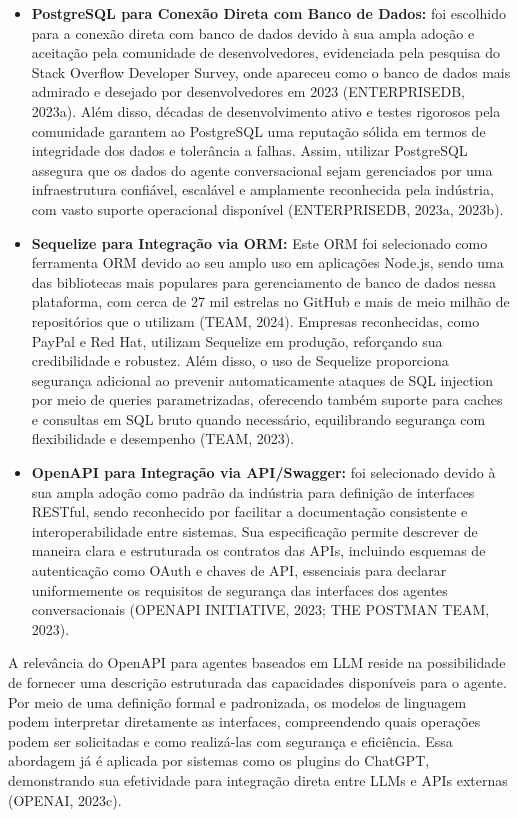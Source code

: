 \documentclass[
]{article}
\begin{document}
\begin{itemize}
\item
  \textbf{PostgreSQL para Conexão Direta com Banco de Dados:} foi
  escolhido para a conexão direta com banco de dados devido à sua ampla
  adoção e aceitação pela comunidade de desenvolvedores, evidenciada
  pela pesquisa do Stack Overflow Developer Survey, onde apareceu como o
  banco de dados mais admirado e desejado por desenvolvedores em 2023
  (ENTERPRISEDB, 2023a). Além disso, décadas de desenvolvimento ativo e
  testes rigorosos pela comunidade garantem ao PostgreSQL uma reputação
  sólida em termos de integridade dos dados e tolerância a falhas.
  Assim, utilizar PostgreSQL assegura que os dados do agente
  conversacional sejam gerenciados por uma infraestrutura confiável,
  escalável e amplamente reconhecida pela indústria, com vasto suporte
  operacional disponível (ENTERPRISEDB, 2023a, 2023b).
\item
  \textbf{Sequelize para Integração via ORM:} Este ORM foi selecionado
  como ferramenta ORM devido ao seu amplo uso em aplicações Node.js,
  sendo uma das bibliotecas mais populares para gerenciamento de banco
  de dados nessa plataforma, com cerca de 27 mil estrelas no GitHub e
  mais de meio milhão de repositórios que o utilizam (TEAM, 2024).
  Empresas reconhecidas, como PayPal e Red Hat, utilizam Sequelize em
  produção, reforçando sua credibilidade e robustez. Além disso, o uso
  de Sequelize proporciona segurança adicional ao prevenir
  automaticamente ataques de SQL injection por meio de queries
  parametrizadas, oferecendo também suporte para caches e consultas em
  SQL bruto quando necessário, equilibrando segurança com flexibilidade
  e desempenho (TEAM, 2023).
\item
  \textbf{OpenAPI para Integração via API/Swagger:} foi selecionado
  devido à sua ampla adoção como padrão da indústria para definição de
  interfaces RESTful, sendo reconhecido por facilitar a documentação
  consistente e interoperabilidade entre sistemas. Sua especificação
  permite descrever de maneira clara e estruturada os contratos das
  APIs, incluindo esquemas de autenticação como OAuth e chaves de API,
  essenciais para declarar uniformemente os requisitos de segurança das
  interfaces dos agentes conversacionais (OPENAPI INITIATIVE, 2023; THE
  POSTMAN TEAM, 2023).
\end{itemize}

A relevância do OpenAPI para agentes baseados em LLM reside na
possibilidade de fornecer uma descrição estruturada das capacidades
disponíveis para o agente. Por meio de uma definição formal e
padronizada, os modelos de linguagem podem interpretar diretamente as
interfaces, compreendendo quais operações podem ser solicitadas e como
realizá-las com segurança e eficiência. Essa abordagem já é aplicada por
sistemas como os plugins do ChatGPT, demonstrando sua efetividade para
integração direta entre LLMs e APIs externas (OPENAI, 2023c).
\end{document}
